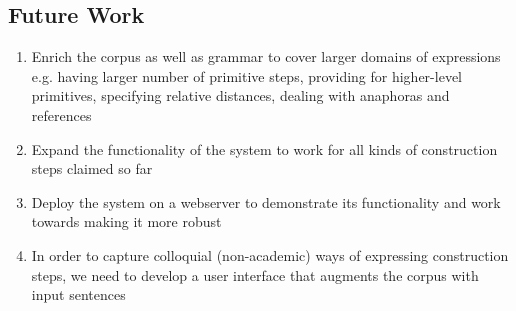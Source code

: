 \def\DevnagVersion{2.15}\documentclass[12pt]{article}
\begin{document}
\subsection{Future Work}
\begin{enumerate}
\item Enrich the corpus as well as grammar to cover larger domains of expressions e.g. having larger number of primitive steps, providing for higher-level primitives, specifying relative distances, dealing with anaphoras and references
\item Expand the functionality of the system to work for all kinds of construction steps claimed so far
\item Deploy the system on a webserver to demonstrate its functionality and work towards making it more robust
\item In order to capture colloquial (non-academic) ways of expressing construction steps, we need to develop a user interface that augments the corpus with input sentences
\end{enumerate}

\nocite{schreck2012geometric}
\nocite{gulwani2011synthesizing}
\nocite{ahmed2012can}
\nocite{itzhaky2012solving}
\nocite{zettlemoyer2012learning}
\nocite{och2003systematic}
\nocite{root-RL-86-phd-ut_semantics-of-anaphora-in-discourse}
\nocite{kamp2011discourse}
\nocite{jurafsky2000speech}
\nocite{mitkov2002anaphora}

\renewcommand\refname{Annotated References}
{}

\end{document}
